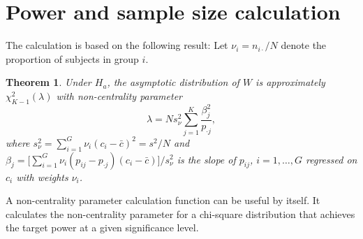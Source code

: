 \documentclass[reqno]{amsart}
\newtheorem{theorem}{Theorem}
\begin{document}
\section{Power and sample size calculation}
The calculation is based on the following result:
Let $\nu_i=n_{i\cdot}/N$ denote the proportion
of subjects in group $i$. 

\begin{theorem}\label{Th:power}
Under $H_a$, the asymptotic distribution of $W$ is approximately $\chi_{K-1}^2(\lambda)$ with non-centrality parameter
\begin{equation}\label{E:ncp}
  \lambda = N  s_\nu^2 \sum_{j=1}^K \frac{\beta_j^2}{p_{\cdot j}},
\end{equation}
where $s_\nu^2= \sum_{i=1}^G \nu_i(c_i-\bar{c})^2=s^2/N$ and $\beta_j=\big[\sum_{i=1}^G \nu_{i}(p_{ij}-p_{\cdot
  j})(c_i-\bar{c})\big] /s_\nu^2$ is the slope of $p_{ij}$, $i=1,\ldots,G$ regressed on $c_i$ with weights $\nu_i$.
\end{theorem}

A non-centrality parameter calculation function can be useful by itself. It calculates the non-centrality parameter for a chi-square distribution that achieves the target power at a given significance level.
\end{document}
